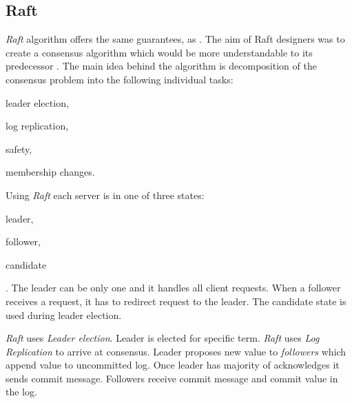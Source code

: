 




\subsection{Raft}
\emph{Raft} algorithm offers the same guarantees, as \paxos. 
The aim of Raft designers was to create a consensus algorithm which would be more understandable to its predecessor \cite{ongaro2014search}. 
The main idea behind the algorithm is decomposition of the consensus problem into the following individual tasks:
\begin{enumerate*}
\item leader election,
\item log replication,
\item safety,
\item membership changes.
\end{enumerate*} 
 Using \emph{Raft} each server is in one of three states: \begin{enumerate*} \item leader, \item follower, \item candidate \end{enumerate*}. The leader can be only one and it handles all client requests. When a follower receives a request, it has to redirect request to the leader. The candidate state is used during leader election. 


\emph{Raft} uses \emph{Leader election}. Leader is elected for specific term. \emph{Raft} uses \emph{Log Replication} to arrive at consensus. Leader proposes new value to \emph{followers} which append value to uncommitted log. Once leader has majority of acknowledges it sends commit message. Followers receive commit message and commit value in the log. 

